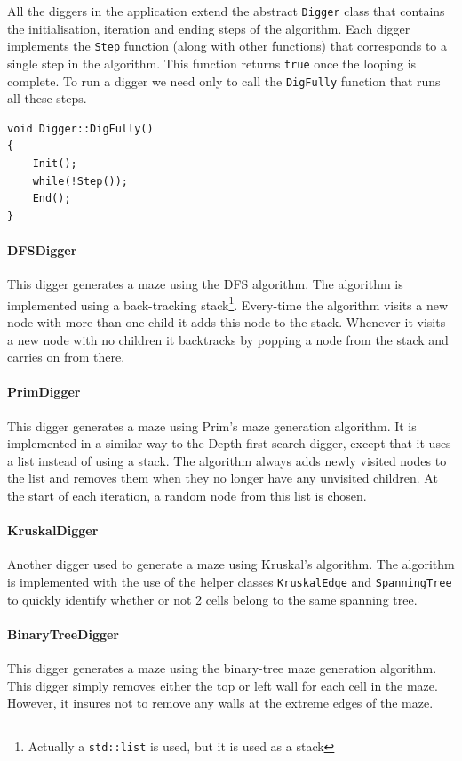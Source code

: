 All the diggers in the application extend the abstract \texttt{Digger} class that contains the initialisation, iteration and ending steps of the algorithm. Each digger implements the \texttt{Step} function (along with other functions) that corresponds to a single step in the algorithm. This function returns \texttt{true} once the looping is complete. To run a digger we need only to call the \texttt{DigFully} function that runs all these steps.
\lstCpp
\begin{lstlisting}
void Digger::DigFully()
{
	Init();
	while(!Step());
	End();
}
\end{lstlisting}

\paragraph{DFSDigger} This digger generates a maze using the DFS algorithm. The algorithm is implemented using a back-tracking stack\footnote{Actually a \texttt{std::list} is used, but it is used as a stack}. Every-time the algorithm visits a new node with more than one child it adds this node to the stack. Whenever it visits a new node with no children it backtracks by popping a node from the stack and carries on from there.
\paragraph{PrimDigger} This digger generates a maze using Prim's maze generation algorithm. It is implemented in a similar way to the Depth-first search digger, except that it uses a list instead of using a stack. The algorithm always adds newly visited nodes to the list and removes them when they no longer have any unvisited children. At the start of each iteration, a random node from this list is chosen.
\paragraph{KruskalDigger} Another digger used to generate a maze using Kruskal's algorithm. The algorithm is implemented with the use of the helper classes \texttt {KruskalEdge} and \texttt{SpanningTree} to quickly identify whether or not 2 cells belong to the same spanning tree.
\paragraph{BinaryTreeDigger} This digger generates a maze using the binary-tree maze generation algorithm. This digger simply removes either the top or left wall for each cell in the maze. However, it insures not to remove any walls at the extreme edges of the maze.

